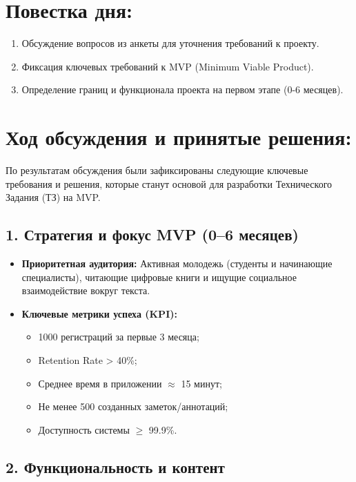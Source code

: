 \documentclass[12pt,a4paper]{article}
\begin{document}
\section*{Повестка дня:}

\begin{enumerate}
    \item Обсуждение вопросов из анкеты для уточнения требований к проекту.
    \item Фиксация ключевых требований к MVP (Minimum Viable Product).
    \item Определение границ и функционала проекта на первом этапе (0-6 месяцев).
\end{enumerate}

\vspace{1cm}

\section*{Ход обсуждения и принятые решения:}

По результатам обсуждения были зафиксированы следующие ключевые требования и решения, которые станут основой для разработки Технического Задания (ТЗ) на MVP.

\subsection*{1. Стратегия и фокус MVP (0–6 месяцев)}

\begin{itemize}
    \item \textbf{Приоритетная аудитория:} Активная молодежь (студенты и начинающие специалисты), читающие цифровые книги и ищущие социальное взаимодействие вокруг текста.
    \item \textbf{Ключевые метрики успеха (KPI):}
    \begin{itemize}
        \item 1000 регистраций за первые 3 месяца;
        \item Retention Rate > 40\%;
        \item Среднее время в приложении $\approx$ 15 минут;
        \item Не менее 500 созданных заметок/аннотаций;
        \item Доступность системы $\geq$ 99.9\%.
    \end{itemize}
\end{itemize}

\subsection*{2. Функциональность и контент}
\end{document}
